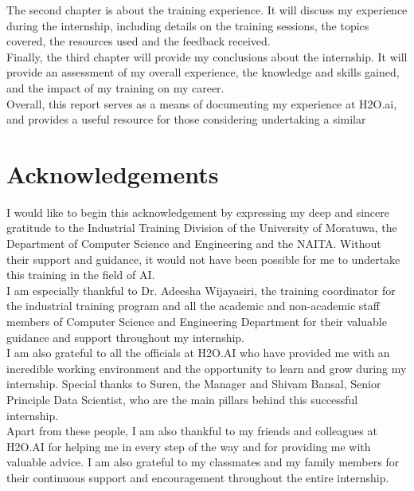 \documentclass[12pt,a4paper]{report}
\begin{document}
The second chapter is about the training experience. It will discuss my experience during the internship, including details on the training sessions, the topics covered, the resources used and the feedback received. \\

Finally, the third chapter will provide my conclusions about the internship. It will provide an assessment of my overall experience, the knowledge and skills gained, and the impact of my training on my career. \\

Overall, this report serves as a means of documenting my experience at H2O.ai, and provides a useful resource for those considering undertaking a similar \\

\chapter*{Acknowledgements}

I would like to begin this acknowledgement by expressing my deep and sincere gratitude to the Industrial Training Division of the University of Moratuwa, the Department of Computer Science and Engineering and the \ac{NAITA}. Without their support and guidance, it would not have been possible for me to undertake this training in the field of \ac{AI}.\\

I am especially thankful to Dr. Adeesha Wijayasiri, the training coordinator for the industrial training program and all the academic and non-academic staff members of Computer Science and Engineering Department for their valuable guidance and support throughout my internship. \\

I am also grateful to all the officials at H2O.AI who have provided me with an incredible working environment and the opportunity to learn and grow during my internship. Special thanks to Suren, the Manager and Shivam Bansal, Senior Principle Data Scientist, who are the main pillars behind this successful internship. \\

Apart from these people, I am also thankful to my friends and colleagues at H2O.AI for helping me in every step of the way and for providing me with valuable advice. I am also grateful to my classmates and my family members for their continuous support and encouragement throughout the entire internship. \
\end{document}
